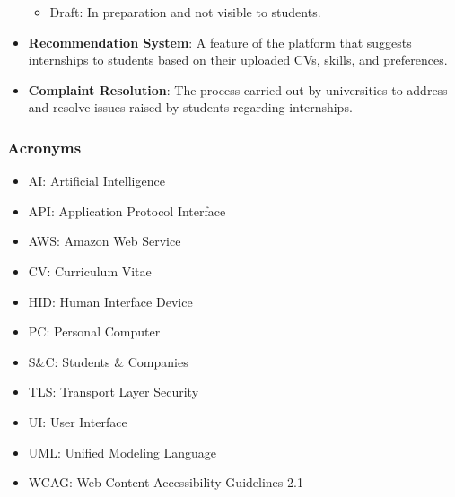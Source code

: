 \begin{itemize}
\begin{itemize}
            \item Draft: In preparation and not visible to students.
        \end{itemize}
    \item \textbf{Recommendation System}: A feature of the platform that suggests internships to students based on their uploaded CVs, skills, and preferences.
    \item \textbf{Complaint Resolution}: The process carried out by universities to address and resolve issues raised by students regarding internships.

\end{itemize}

\subsubsection{Acronyms}
\begin{itemize}
    \item AI: Artificial Intelligence
    \item API: Application Protocol Interface
    \item AWS: Amazon Web Service
    \item CV: Curriculum Vitae
    \item HID: Human Interface Device
    \item PC: Personal Computer
    \item S\&C: Students \& Companies
    \item TLS: Transport Layer Security
    \item UI: User Interface
    \item UML: Unified Modeling Language
    \item WCAG: Web Content Accessibility Guidelines 2.1
\end{itemize}
